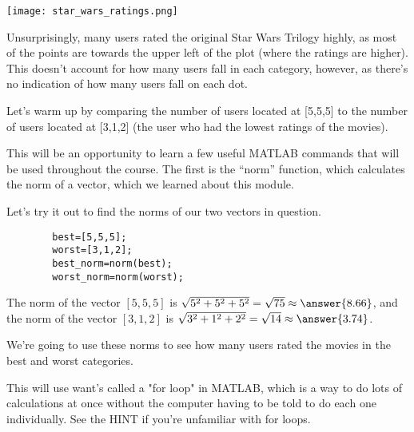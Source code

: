 \documentclass{ximera}
\begin{document}
\begin{exploration}
  \begin{center}
    \texttt{[image: star\_wars\_ratings.png]}
  \end{center}

  Unsurprisingly, many users rated the original Star Wars Trilogy highly, as most of the points are towards the upper left of the plot (where the ratings are higher). This doesn't account for how many users fall in each category, however, as there's no indication of how  many users fall on each dot. 

\end{exploration}

\begin{exploration}
  
 Let's warm up by comparing the number of users located at [5,5,5] to the number of users located at [3,1,2] (the user who had the lowest ratings of the movies).

  This will be an opportunity to learn a few useful MATLAB commands that will be used throughout the course. The first is the ``norm'' function, which calculates the norm of a vector, which we learned about this module.

  Let's try it out to find the norms of our two vectors in question. 

  \begin{remark}
    \begin{verbatim}
        best=[5,5,5];
        worst=[3,1,2];
        best_norm=norm(best);
        worst_norm=norm(worst);
    \end{verbatim}
  \end{remark}

  \begin{example}

    The norm of the vector $[5,5,5]$ is $\sqrt{5^2+5^2+5^2}=\sqrt{75}\approx \answer{8.66}$, and the norm of the vector $[3,1,2]$ is $\sqrt{3^2+1^2+2^2}=\sqrt{14}\approx \answer{3.74}$.

  \end{example}

  We're going to use these norms to see how many users rated the movies in the best and worst categories. 
  
  This will use want's called a "for loop" in MATLAB, which is a way to do lots of calculations at once without the computer having to be told to do each one individually. See the HINT if you're unfamiliar with for loops.

\begin{remark}


\end{remark}
\end{exploration}
\end{document}
